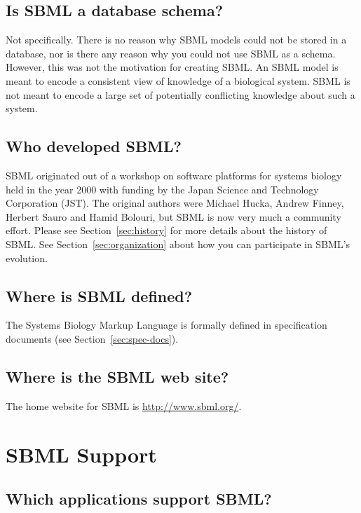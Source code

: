 \documentclass{sbmlfaq}
\begin{document}
\subsection{Is SBML a database schema?}

Not specifically.  There is no reason why SBML models could not be stored
in a database, nor is there any reason why you could not use SBML as a
schema.  However, this was not the motivation for creating SBML.  An SBML
model is meant to encode a consistent view of knowledge of a biological
system.  SBML is not meant to encode a large set of potentially conflicting
knowledge about such a system.

\subsection{Who developed SBML?}

SBML originated out of a workshop on software platforms for systems biology
held in the year 2000 with funding by the Japan Science and Technology
Corporation (JST).  The original authors were Michael Hucka, Andrew Finney,
Herbert Sauro and Hamid Bolouri, but SBML is now very much a community
effort.  Please see Section~\ref{sec:history} for more details about the
history of SBML.  See Section~\ref{sec:organization} about how you can
participate in SBML's evolution.

\subsection{Where is SBML defined?}

The Systems Biology Markup Language is formally defined in specification
documents (see Section~\ref{sec:spec-docs}).

\subsection{Where is the SBML web site?}

The home website for SBML is \url{http://www.sbml.org/}.


\section{SBML Support}
\label{sec:sbml-support}

\subsection{Which applications support SBML?}
\end{document}
